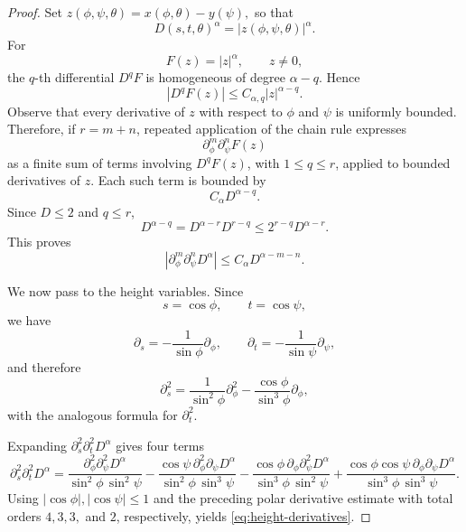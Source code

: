 \documentclass[11pt]{amsart}
\begin{document}
\begin{proof}
Set $z(\phi,\psi,\theta)
=
x(\phi,\theta)-y(\psi),$
so that
\[
D(s,t,\theta)^\alpha=|z(\phi,\psi,\theta)|^\alpha.
\]
For
\[
F(z)=|z|^\alpha,\qquad z\neq0,
\]
the $q$-th differential $D^qF$ is homogeneous of degree $\alpha-q$.
Hence
\[
|D^qF(z)|
\le
C_{\alpha,q}|z|^{\alpha-q}.
\]
Observe that every derivative of $z$ with respect to $\phi$ and $\psi$ is uniformly
bounded. Therefore, if $r=m+n$, repeated application of the chain rule
expresses
\[
\partial_\phi^m\partial_\psi^nF(z)
\]
as a finite sum of terms involving $D^qF(z)$, with $1\le q\le r$,
applied to bounded derivatives of $z$. Each such term is bounded by
\[
C_\alpha D^{\alpha-q}.
\]
Since $D\le2$ and $q\le r$,
\[
D^{\alpha-q}
=
D^{\alpha-r}D^{r-q}
\le
2^{r-q}D^{\alpha-r}.
\]
This proves
\[
\left|
\partial_\phi^m\partial_\psi^nD^\alpha
\right|
\le
C_\alpha D^{\alpha-m-n}.
\]

We now pass to the height variables. Since
\[
s=\cos\phi,\qquad t=\cos\psi,
\]
we have
\[
\partial_s
=
-\frac1{\sin\phi}\partial_\phi,
\qquad
\partial_t
=
-\frac1{\sin\psi}\partial_\psi,
\]
and therefore
\[
\partial_s^2
=
\frac1{\sin^2\phi}\partial_\phi^2
-
\frac{\cos\phi}{\sin^3\phi}\partial_\phi,
\]
with the analogous formula for $\partial_t^2$.

Expanding $\partial_s^2\partial_t^2D^\alpha$ gives four terms
\begin{equation*}
\partial_s^2\partial_t^2D^\alpha
=
\frac{\partial_\phi^2\partial_\psi^2D^\alpha}
     {\sin^2\phi\,\sin^2\psi}
-
\frac{\cos\psi\,
      \partial_\phi^2\partial_\psi D^\alpha}
     {\sin^2\phi\,\sin^3\psi}-
\frac{\cos\phi\,
      \partial_\phi\partial_\psi^2D^\alpha}
     {\sin^3\phi\,\sin^2\psi}
+
\frac{\cos\phi\cos\psi\,
      \partial_\phi\partial_\psi D^\alpha}
     {\sin^3\phi\,\sin^3\psi}.
\end{equation*}
Using $|\cos\phi|,|\cos\psi|\le1$ and the preceding polar derivative
estimate with total orders $4,3,3,$ and $2$, respectively, yields
\eqref{eq:height-derivatives}.
\end{proof}

\end{document}
